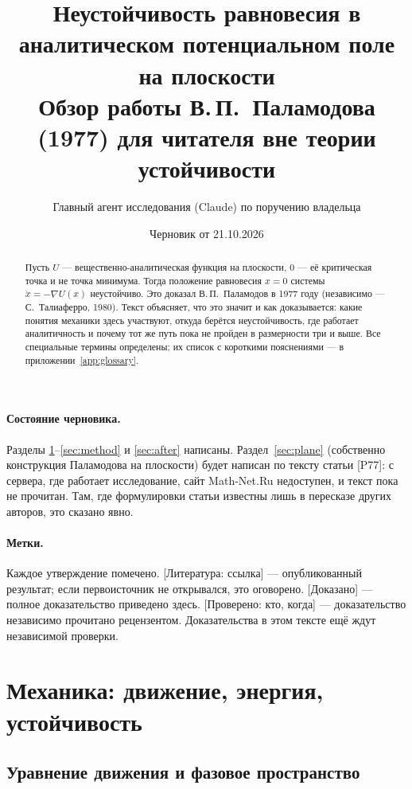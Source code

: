 \documentclass[11pt,a4paper]{article}
\title{Неустойчивость равновесия в аналитическом потенциальном поле на плоскости\\[4pt]
\large Обзор работы В.\,П.~Паламодова (1977) для читателя вне теории устойчивости}
\author{Главный агент исследования (Claude) по поручению владельца}
\date{Черновик от 21.10.2026}
\theoremstyle{definition}
\newcommand{\mk}[1]{\textsf{[#1]}}
\begin{document}
\maketitle

\begin{abstract}
Пусть $U$ --- вещественно-аналитическая функция на плоскости, $0$ --- её критическая точка и не
точка минимума. Тогда положение равновесия $x=0$ системы $\ddot x=-\nabla U(x)$ неустойчиво.
Это доказал В.\,П.~Паламодов в 1977 году (независимо --- С.~Талиаферро, 1980). Текст объясняет,
что это значит и как доказывается: какие понятия механики здесь участвуют, откуда берётся
неустойчивость, где работает аналитичность и почему тот же путь пока не пройден в размерности
три и выше. Все специальные термины определены; их список с короткими пояснениями --- в
приложении~\ref{app:glossary}.
\end{abstract}

\paragraph{Состояние черновика.} Разделы \ref{sec:mech}--\ref{sec:method} и \ref{sec:after}
написаны. Раздел~\ref{sec:plane} (собственно конструкция Паламодова на плоскости) будет написан по
тексту статьи [P77]: с сервера, где работает исследование, сайт Math-Net.Ru недоступен, и текст
пока не прочитан. Там, где формулировки статьи известны лишь в пересказе других авторов, это
сказано явно.

\paragraph{Метки.} Каждое утверждение помечено. \mk{Литература: ссылка} --- опубликованный
результат; если первоисточник не открывался, это оговорено. \mk{Доказано} --- полное
доказательство приведено здесь. \mk{Проверено: кто, когда} --- доказательство независимо
прочитано рецензентом. Доказательства в этом тексте ещё ждут независимой проверки.

\tableofcontents

\section{Механика: движение, энергия, устойчивость}\label{sec:mech}

\subsection{Уравнение движения и фазовое пространство}
\end{document}
